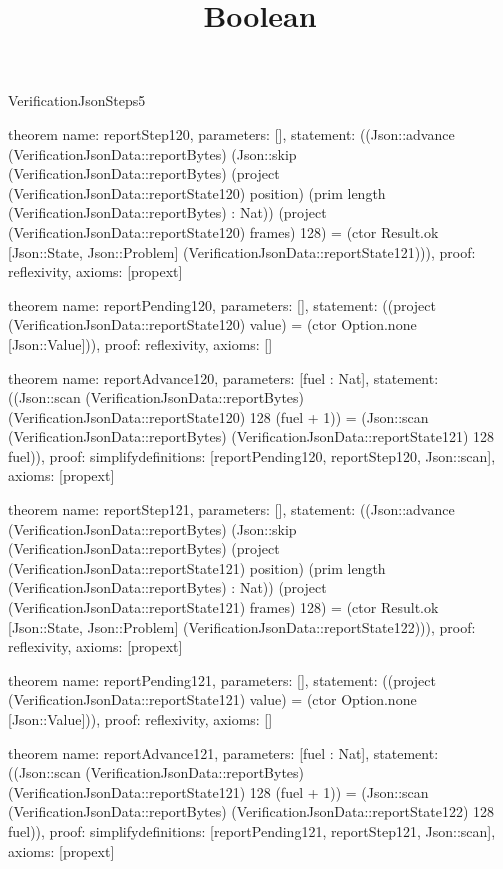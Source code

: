 \begin{lexlean}{VerificationJsonSteps5}
\title{Boolean}
\begin{semanticmodule}

theorem{
  name: reportStep120,
  parameters: [],
  statement: ((Json::advance (VerificationJsonData::reportBytes) (Json::skip (VerificationJsonData::reportBytes) (project (VerificationJsonData::reportState120) position) (prim length (VerificationJsonData::reportBytes) : Nat)) (project (VerificationJsonData::reportState120) frames) 128) = (ctor Result.ok [Json::State, Json::Problem] (VerificationJsonData::reportState121))),
  proof: reflexivity{},
  axioms: [propext]
}

theorem{
  name: reportPending120,
  parameters: [],
  statement: ((project (VerificationJsonData::reportState120) value) = (ctor Option.none [Json::Value])),
  proof: reflexivity{},
  axioms: []
}

theorem{
  name: reportAdvance120,
  parameters: [fuel : Nat],
  statement: ((Json::scan (VerificationJsonData::reportBytes) (VerificationJsonData::reportState120) 128 (fuel + 1)) = (Json::scan (VerificationJsonData::reportBytes) (VerificationJsonData::reportState121) 128 fuel)),
  proof: simplify{definitions: [reportPending120, reportStep120, Json::scan]},
  axioms: [propext]
}

theorem{
  name: reportStep121,
  parameters: [],
  statement: ((Json::advance (VerificationJsonData::reportBytes) (Json::skip (VerificationJsonData::reportBytes) (project (VerificationJsonData::reportState121) position) (prim length (VerificationJsonData::reportBytes) : Nat)) (project (VerificationJsonData::reportState121) frames) 128) = (ctor Result.ok [Json::State, Json::Problem] (VerificationJsonData::reportState122))),
  proof: reflexivity{},
  axioms: [propext]
}

theorem{
  name: reportPending121,
  parameters: [],
  statement: ((project (VerificationJsonData::reportState121) value) = (ctor Option.none [Json::Value])),
  proof: reflexivity{},
  axioms: []
}

theorem{
  name: reportAdvance121,
  parameters: [fuel : Nat],
  statement: ((Json::scan (VerificationJsonData::reportBytes) (VerificationJsonData::reportState121) 128 (fuel + 1)) = (Json::scan (VerificationJsonData::reportBytes) (VerificationJsonData::reportState122) 128 fuel)),
  proof: simplify{definitions: [reportPending121, reportStep121, Json::scan]},
  axioms: [propext]
}


\end{semanticmodule}
\end{lexlean}
